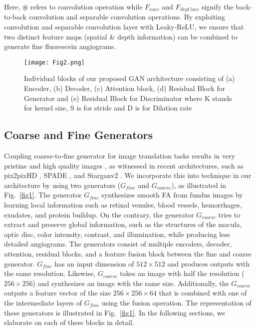 \documentclass[a4paper,conference]{IEEEtran}
\begin{document}
Here, $\circledast$ refers to convolution operation while $F_{conv}$ and $F_{SepConv}$ signify the back-to-back convolution and separable convolution operations. By exploiting convolution and separable convolution layer with Leaky-ReLU, we ensure that two distinct feature maps (spatial \& depth information) can be combined to generate fine fluorescein angiograms. 


\fi


\begin{figure}[htb]
    \centering
    \texttt{[image: Fig2.png]}
    \caption{Individual blocks of our proposed GAN architecture consisting of (a) Encoder, (b) Decoder, (c) Attention block, (d) Residual Block for Generator and (e) Residual Block for Discriminator where K stands for kernel size, S is for stride  and D is for Dilation rate }\label{fig2}
\end{figure}

\subsection{Coarse and Fine Generators}
\label{subsec:generators}
Coupling coarse-to-fine generator for image translation tasks results in very pristine and high quality images , as witnessed in recent architectures, such as pix2pixHD \cite{wang2018high}, SPADE \cite{park2019semantic}, and Starganv2 \cite{choi2020stargan}. We incorporate this into technique in our architecture by using two generators ($G_{fine}$ and $G_{coarse}$), as illustrated in Fig.~\ref{fig1}. The generator $G_{fine}$ synthesizes smooth FA from fundus images by learning local information such as retinal venules, blood vessels, hemorrhages, exudates, and protein buildup. On the contrary, the generator $G_{coarse}$ tries to extract and preserve global information, such as the structures of the macula, optic disc, color intensity, contrast, and illumination, while producing less detailed angiograms. The generators consist of multiple encoders, decoder, attention, residual blocks, and a feature fusion block between the fine and coarse generator. $G_{fine}$  has an input dimension of  $512\times 512$ and produces outputs with the same resolution. Likewise, $G_{coarse}$ takes an image with half the resolution ($256\times 256$) and synthesizes an image with the same size. Additionally, the $G_{coarse}$ outputs a feature vector of the size $256\times 256 \times 64$ that is combined with one of the intermediate layers of $G_{fine}$ using the fusion operation. The representation of these generators is illustrated in Fig.~\ref{fig1}. In the following sections, we elaborate on each of these blocks in detail.
\end{document}
